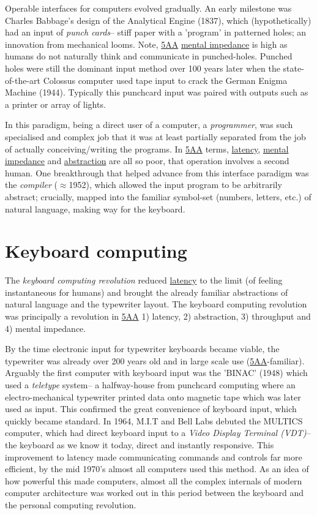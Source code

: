 \documentclass[logo,bsc,singlespacing,parskip]{infthesis}
\begin{document}
Operable interfaces for computers evolved gradually.
An early milestone was Charles Babbage's design of the Analytical Engine (1837), which (hypothetically) had an input of \emph{punch cards}-- stiff paper with a 'program' in patterned holes; an innovation from mechanical looms.
Note, \hyperref[orgce96c46]{5AA} \hyperref[mental impedance]{mental impedance} is high as humans do not naturally think and communicate in punched-holes.
Punched holes were still the dominant input method over 100 years later when the state-of-the-art Colossus computer used tape input to crack the German Enigma Machine (1944).
Typically this punchcard input was paired with outputs such as a printer or array of lights.

In this paradigm, being a direct user of a computer, a \emph{programmer}, was such specialised and complex job that it was at least partially separated from the job of actually conceiving/writing the programs.
In \hyperref[orgce96c46]{5AA} terms, \hyperref[latency]{latency}, \hyperref[mental impedance]{mental impedance} and \hyperref[abstraction]{abstraction} are all so poor, that operation involves a second human.
One breakthrough that helped advance from this interface paradigm was the \emph{compiler} (\(\approx\)1952), which allowed the input program to be arbitrarily abstract; crucially, mapped into the familiar symbol-set (numbers, letters, etc.) of natural language, making way for the keyboard.

\section{Keyboard computing}
\label{sec:org2e8520f}
The \emph{keyboard computing revolution} reduced \hyperref[latency]{latency} to the limit (of feeling instantaneous for humans) and brought the already familiar abstractions of natural language and the typewriter layout.
The keyboard computing revolution was principally a revolution in \hyperref[orgce96c46]{5AA} 1) latency, 2) abstraction, 3) throughput and 4) mental impedance.

By the time electronic input for typewriter keyboards became viable, the typewriter was already over 200 years old and in large scale use (\hyperref[orgce96c46]{5AA}-familiar).
Arguably the first computer with keyboard input was the 'BINAC' (1948) which used a \emph{teletype} system-- a halfway-house from punchcard computing where an electro-mechanical typewriter printed data onto magnetic tape which was later used as input.
This confirmed the great convenience of keyboard input, which quickly became standard.
In 1964, M.I.T and Bell Labs debuted the MULTICS computer, which had direct keyboard input to a \emph{Video Display Terminal (VDT)}-- the keyboard as we know it today, direct and instantly responsive.
This improvement to latency made communicating commands and controls far more efficient, by the mid 1970's almost all computers used this method.
As an idea of how powerful this made computers, almost all the complex internals of modern computer architecture was worked out  in this period between the keyboard and the personal computing revolution.
\end{document}
